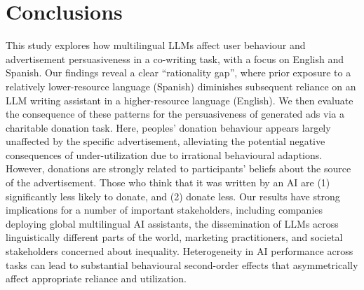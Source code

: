 \section{Conclusions}
This study explores how multilingual LLMs affect user behaviour and advertisement persuasiveness in a co-writing task, with a focus on English and Spanish. Our findings reveal a clear ``rationality gap'', where prior exposure to a relatively lower-resource language (Spanish) diminishes subsequent reliance on an LLM writing assistant in a higher-resource language (English). We then evaluate the consequence of these patterns for the persuasiveness of generated ads via a charitable donation task. Here, peoples' donation behaviour appears largely unaffected by the specific advertisement, alleviating the potential negative consequences of under-utilization due to irrational behavioural adaptions. However, donations are strongly related to participants' beliefs about the source of the advertisement. Those who think that it was written by an AI are (1) significantly less likely to donate, and (2) donate less. Our results have strong implications for a number of important stakeholders, including companies deploying global multilingual AI assistants, the dissemination of LLMs across linguistically different parts of the world, marketing practitioners, and societal stakeholders concerned about inequality. Heterogeneity in AI performance across tasks can lead to substantial behavioural second-order effects that asymmetrically affect appropriate reliance and utilization.  

